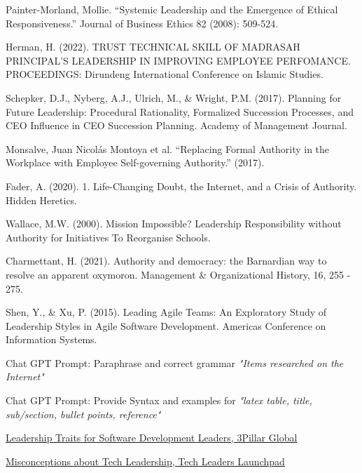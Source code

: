 \documentclass[runningheads]{llncs}
\begin{document}
\newpage

\begin{thebibliography}{10}

Painter-Morland, Mollie. “Systemic Leadership and the Emergence of Ethical Responsiveness.” Journal of Business Ethics 82 (2008): 509-524.

Herman, H. (2022). TRUST TECHNICAL SKILL OF MADRASAH PRINCIPAL’S LEADERSHIP IN IMPROVING EMPLOYEE PERFOMANCE. PROCEEDINGS: Dirundeng International Conference on Islamic Studies.

Schepker, D.J., Nyberg, A.J., Ulrich, M., \& Wright, P.M. (2017). Planning for Future Leadership: Procedural Rationality, Formalized Succession Processes, and CEO Influence in CEO Succession Planning. Academy of Management Journal.

Monsalve, Juan Nicolás Montoya et al. “Replacing Formal Authority in the Workplace with Employee Self-governing Authority.” (2017).

Fader, A. (2020). 1. Life-Changing Doubt, the Internet, and a Crisis of Authority. Hidden Heretics.

Wallace, M.W. (2000). Mission Impossible? Leadership Responsibility without Authority for Initiatives To Reorganise Schools.

Charmettant, H. (2021). Authority and democracy: the Barnardian way to resolve an apparent oxymoron. Management \& Organizational History, 16, 255 - 275.

Shen, Y., \& Xu, P. (2015). Leading Agile Teams: An Exploratory Study of Leadership Styles in Agile Software Development. Americas Conference on Information Systems.

Chat GPT Prompt: Paraphrase and correct grammar \textit{"Items researched on the Internet"}

Chat GPT Prompt: Provide Syntax and examples for \textit{"latex table, title, sub/section, bullet points, reference"}


\href{https://www.3pillarglobal.com/insights/10-leadership-traits-for-modern-software-development-leaders/}{Leadership Traits for Software Development Leaders, 3Pillar Global}

\href{https://techleaderslaunchpad.com/blog/7-misconceptions-about-tech-leadership}{Misconceptions about Tech Leadership, Tech Leaders Launchpad}


\end{thebibliography}
\end{document}
